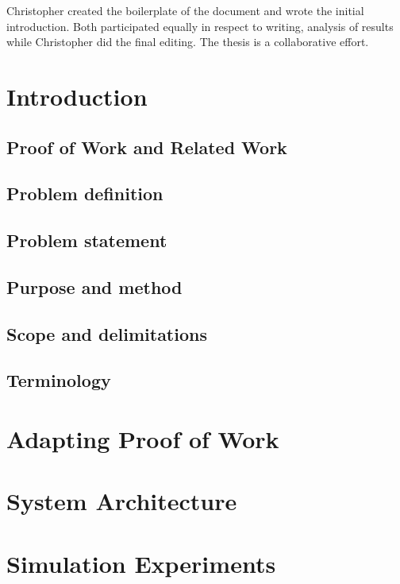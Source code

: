 \documentclass[a4paper,11pt]{kth-mag}
\begin{document}
Christopher created the boilerplate of the document and wrote the initial introduction.
Both participated equally in respect to writing, analysis of results while Christopher did the final editing. The thesis is a collaborative effort.
\newpage  
\setcounter{section}{0}
\tableofcontents
\newpage
\section{Introduction}

\subsection*{Proof of Work and Related Work}

\subsection*{Problem definition}

\subsection*{Problem statement} %

\subsection*{Purpose and method}

\subsection*{Scope and delimitations}

%
\subsection*{Terminology}


\section{Adapting Proof of Work}

\section{System Architecture}

\section{Simulation Experiments}

\end{document}
